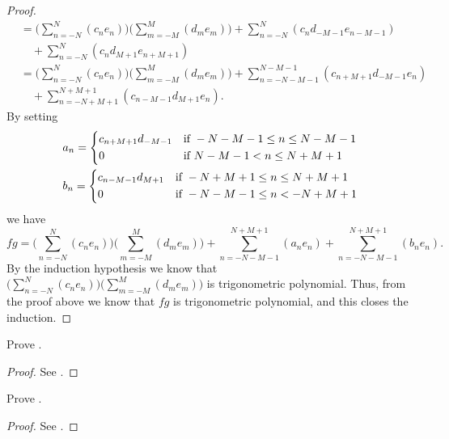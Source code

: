 \begin{proof}
\begin{align*}
        & = \bigg(\sum_{n = -N}^N (c_n e_n)\bigg) \bigg(\sum_{m = -M}^M (d_m e_m)\bigg) + \sum_{n = -N}^N (c_n d_{-M - 1} e_{n - M - 1})                   \\
        & \quad + \sum_{n = -N}^N (c_n d_{M + 1} e_{n + M + 1})                                                                                            \\
        & = \bigg(\sum_{n = -N}^N (c_n e_n)\bigg) \bigg(\sum_{m = -M}^M (d_m e_m)\bigg) + \sum_{n = -N - M - 1}^{N - M - 1} (c_{n + M + 1} d_{-M - 1} e_n) \\
        & \quad + \sum_{n = -N + M + 1}^{N + M + 1} (c_{n - M - 1} d_{M + 1} e_n).
  \end{align*}
  By setting
  \begin{align*}
     & a_n = \begin{dcases}
               c_{n + M + 1} d_{-M - 1} & \text{if } -N - M - 1 \leq n \leq N - M - 1 \\
               0                        & \text{if } N - M - 1 < n \leq N + M + 1
             \end{dcases} \\
     & b_n = \begin{dcases}
               c_{n - M - 1} d_{M + 1} & \text{if } -N + M + 1 \leq n \leq N + M + 1 \\
               0                       & \text{if } -N - M - 1 \leq n < -N + M + 1
             \end{dcases}
  \end{align*}
  we have
  \[
    fg = \bigg(\sum_{n = -N}^N (c_n e_n)\bigg) \bigg(\sum_{m = -M}^M (d_m e_m)\bigg) + \sum_{n = -N - M - 1}^{N + M + 1} (a_n e_n) + \sum_{n = -N - M - 1}^{N + M + 1} (b_n e_n).
  \]
  By the induction hypothesis we know that \(\bigg(\sum_{n = -N}^N (c_n e_n)\bigg) \bigg(\sum_{m = -M}^M (d_m e_m)\bigg)\) is trigonometric polynomial.
  Thus, from the proof above we know that \(fg\) is trigonometric polynomial, and this closes the induction.
\end{proof}

\begin{ex}\label{ii:ex:5.3.2}
  Prove .
\end{ex}

\begin{proof}
  See .
\end{proof}

\begin{ex}\label{ii:ex:5.3.3}
  Prove .
\end{ex}

\begin{proof}
  See .
\end{proof}
